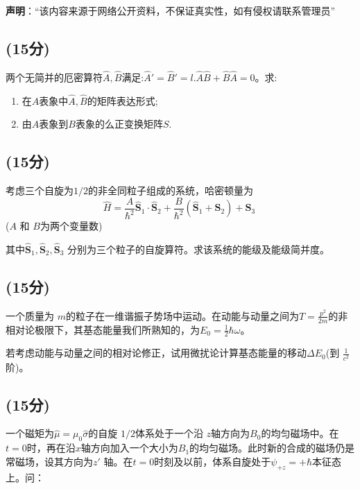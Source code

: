 
\textbf{声明}：“该内容来源于网络公开资料，不保证真实性，如有侵权请联系管理员”

\subsection{(15分)}
两个无简并的厄密算符$\hat{A},\hat{B}$满足:$\hat{A}'=\hat{B}'=l$.$\hat{A}\hat{B}+\hat{B}\hat{A}=0$。求:
\begin{enumerate}
\item 在$A$表象中$\hat{A},\hat{B}$的矩阵表达形式;
\item 由$A$表象到$B$表象的么正变换矩阵$S$.
\end{enumerate}
\subsection{(15分)}
考虑三个自旋为$1/2$的非全同粒子组成的系统，哈密顿量为$$\hat{H} = \frac{A}{\hbar^2} \hat{\mathbf{S}}_1 \cdot \hat{\mathbf{S}}_2 + \frac{B}{\hbar^2} (\hat{\mathbf{S}}_1  + \hat{\mathbf{S}}_2)+\hat{\mathbf{S}}_3~$$ ($A$ 和 $B$为两个变量数)

其中$\hat{\mathbf{S}}_1, \hat{\mathbf{S}}_2, \hat{\mathbf{S}}_3$ 分别为三个粒子的自旋算符。求该系统的能级及能级简并度。
\subsection{(15分)}
 一个质量为 $m$的粒子在一维谐振子势场中运动。在动能与动量之间为$T = \frac{p^2}{2m}$的非相对论极限下，其基态能量我们所熟知的，为$E_0 = \frac{1}{2}\hbar\omega$。

若考虑动能与动量之间的相对论修正，试用微扰论计算基态能量的移动$\Delta E_0$(到 $\frac{1}{c^2}$阶)。
\subsection{(15分)}
一个磁矩为$\hat{\mu} = \mu_0 \hat{\sigma}$的自旋 $1/2$体系处于一个沿 $z$轴方向为$B_0$的均匀磁场中。在$t=0$时，再在沿$x$轴方向加入一个大小为$B_1$的均匀磁场。此时新的合成的磁场仍是常磁场，设其方向为$z'$ 轴。在$t=0$时刻及以前，体系自旋处于$\psi_{+z} = +\hbar$本征态上。问：

